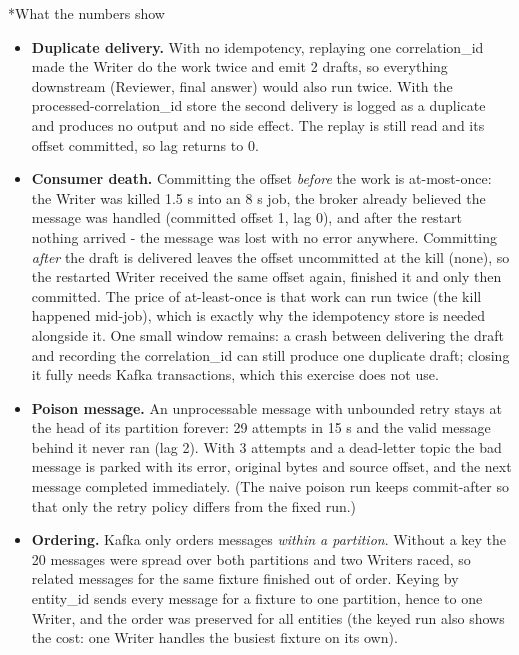 \documentclass[11pt]{article}
\makeatletter
\renewcommand\subsection{\@startsection{subsection}{2}{\z@}{-2.2ex \@plus -1ex \@minus -.2ex}{0.8ex \@plus.2ex}{\normalfont\fontsize{12}{14.5}\selectfont\bfseries}}
\makeatother
\begin{document}
\subsection*{What the numbers show}
\begin{itemize}\setlength\itemsep{2pt}
\item \textbf{Duplicate delivery.} With no idempotency, replaying one correlation\_id made the Writer do the work twice and emit 2 drafts, so everything downstream (Reviewer, final answer) would also run twice. With the processed-correlation\_id store the second delivery is logged as a duplicate and produces no output and no side effect. The replay is still read and its offset committed, so lag returns to 0.
\item \textbf{Consumer death.} Committing the offset \emph{before} the work is at-most-once: the Writer was killed 1.5 s into an 8 s job, the broker already believed the message was handled (committed offset 1, lag 0), and after the restart nothing arrived - the message was lost with no error anywhere. Committing \emph{after} the draft is delivered leaves the offset uncommitted at the kill (none), so the restarted Writer received the same offset again, finished it and only then committed. The price of at-least-once is that work can run twice (the kill happened mid-job), which is exactly why the idempotency store is needed alongside it. One small window remains: a crash between delivering the draft and recording the correlation\_id can still produce one duplicate draft; closing it fully needs Kafka transactions, which this exercise does not use.
\item \textbf{Poison message.} An unprocessable message with unbounded retry stays at the head of its partition forever: 29 attempts in 15 s and the valid message behind it never ran (lag 2). With 3 attempts and a dead-letter topic the bad message is parked with its error, original bytes and source offset, and the next message completed immediately. (The naive poison run keeps commit-after so that only the retry policy differs from the fixed run.)
\item \textbf{Ordering.} Kafka only orders messages \emph{within a partition}. Without a key the 20 messages were spread over both partitions and two Writers raced, so related messages for the same fixture finished out of order. Keying by entity\_id sends every message for a fixture to one partition, hence to one Writer, and the order was preserved for all entities (the keyed run also shows the cost: one Writer handles the busiest fixture on its own).
\end{itemize}
\end{document}
